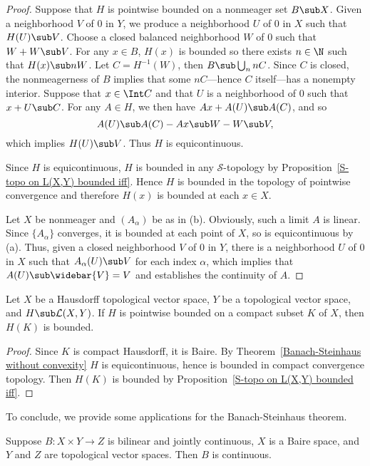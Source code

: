 \begin{proof}
Suppose that $H$ is pointwise bounded on a nonmeager set $B\sub X$. Given a neighborhood $V$ of $0$ in $Y$, we produce a neighborhood $U$ of $0$ in $X$ such that $H(U)\sub V$. Choose a closed balanced neighborhood $W$ of $0$ such that $W+W\sub V$. For any $x\in B$, $H(x)$ is bounded so there exists $n\in\N$ such that $H(x)\sub nW$. Let $C=H^{-1}(W)$, then $B\sub\bigcup_nnC$. Since $C$ is closed, the nonmeagerness of $B$ implies that some $nC$---hence $C$ itself---has a nonempty interior. Suppose that $x\in\Int C$ and that $U$ is a neighborhood of $0$ such that $x+U\sub C$. For any $A\in H$, we then have $Ax+A(U)\sub A(C)$, and so 
\[A(U)\sub A(C)-Ax\sub W-W\sub V,\]
which implies $H(U)\sub V$. Thus $H$ is equicontinuous.\par
Since $H$ is equicontinuous, $H$ is bounded in any $\mathcal{S}$-topology by Proposition~\ref{S-topo on L(X,Y) bounded iff}. Hence $H$ is bounded in the topology of pointwise convergence and therefore $H(x)$ is bounded at each $x\in X$.\par
Let $X$ be nonmeager and $(A_\alpha)$ be as in (b). Obviously, such a limit $A$ is linear. Since $\{A_\alpha\}$ converges, it is bounded at each point of $X$, so is equicontinuous by (a). Thus, given a closed neighborhood $V$ of $0$ in $Y$, there is a neighborhood $U$ of $0$ in $X$ such that $A_\alpha(U)\sub V$ for each index $\alpha$, which implies that $A(U)\sub\widebar{V}=V$ and establishes the continuity of $A$.
\end{proof}
\begin{proposition}\label{Banach-Steinhaus pointwise bounded on convex compact}
Let $X$ be a Hausdorff topological vector space, $Y$ be a topological vector space, and $H\sub\mathcal{L}(X,Y)$.  If $H$ is pointwise bounded on a compact subset $K$ of $X$, then $H(K)$ is bounded.
\end{proposition}
\begin{proof}
Since $K$ is compact Hausdorff, it is Baire. By Theorem~\ref{Banach-Steinhaus without convexity} $H$ is equicontinuous, hence is bounded in compact convergence topology. Then $H(K)$ is bounded by Proposition~\ref{S-topo on L(X,Y) bounded iff}.
\end{proof}
To conclude, we provide some applications for the Banach-Steinhaus theorem.
\begin{proposition}\label{TVS bilinear jointly continuous}
Suppose $B:X\times Y\to Z$ is bilinear and jointly continuous, $X$ is a Baire space, and $Y$ and $Z$ are topological vector spaces. Then $B$ is continuous.
\end{proposition}
